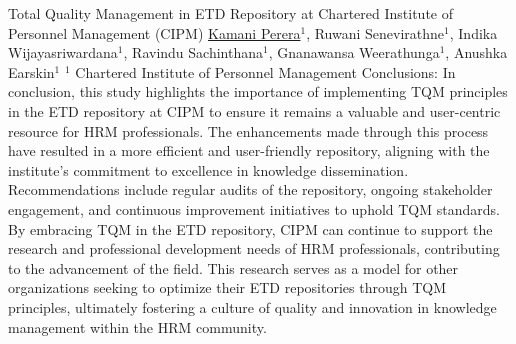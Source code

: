 \begin{abstract_online}{Total Quality Management in ETD Repository at Chartered Institute of Personnel Management (CIPM)}{%
    \underline{Kamani Perera}$^{1}$, Ruwani Senevirathne$^{1}$, Indika Wijayasriwardana$^{1}$, Ravindu Sachinthana$^{1}$, Gnanawansa Weerathunga$^{1}$, Anushka Earskin$^{1}$}{%
    }{%
    $^1$ Chartered Institute of Personnel Management}
Conclusions: In conclusion, this study highlights the importance of implementing TQM principles in the ETD repository at CIPM to ensure it remains a valuable and user-centric resource for HRM professionals. The enhancements made through this process have resulted in a more efficient and user-friendly repository, aligning with the institute's commitment to excellence in knowledge dissemination. Recommendations include regular audits of the repository, ongoing stakeholder engagement, and continuous improvement initiatives to uphold TQM standards. By embracing TQM in the ETD repository, CIPM can continue to support the research and professional development needs of HRM professionals, contributing to the advancement of the field. This research serves as a model for other organizations seeking to optimize their ETD repositories through TQM principles, ultimately fostering a culture of quality and innovation in knowledge management within the HRM community.

\end{abstract_online}

